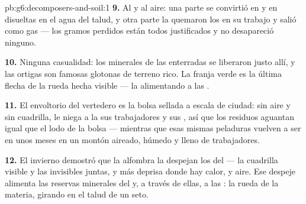 \begin{solution}{pb:g6:decomposers-and-soil:1}
\textbf{9.} Al  y al aire: una parte se convirtió en  y en
 disueltas en el agua del talud, y otra parte la
quemaron los  en su trabajo y salió como gas --- los
gramos perdidos están todos justificados y no desapareció ninguno.

\textbf{10.} Ninguna casualidad: los minerales de las  enterradas
se liberaron justo allí, y las ortigas son famosas glotonas de terreno
rico. La franja verde es la última flecha de la rueda hecha visible ---
la  alimentando a las .

\textbf{11.} El envoltorio del vertedero es la bolsa sellada a escala
de ciudad: sin aire y sin cuadrilla, le niega a la  sus
trabajadores y sus , así que los residuos aguantan igual que
el lodo de la bolsa --- mientras que esas mismas peladuras vuelven a
ser  en unos meses en un montón aireado, húmedo y lleno de
trabajadores.

\textbf{12.} El invierno demostró que la alfombra la despejan los
 del  --- la cuadrilla visible y las invisibles
juntas, y más deprisa donde hay calor,  y aire. Ese despeje
alimenta las reservas minerales del  y, a través de ellas, a las
: la rueda de la materia, girando en el talud de un seto.
\end{solution}
